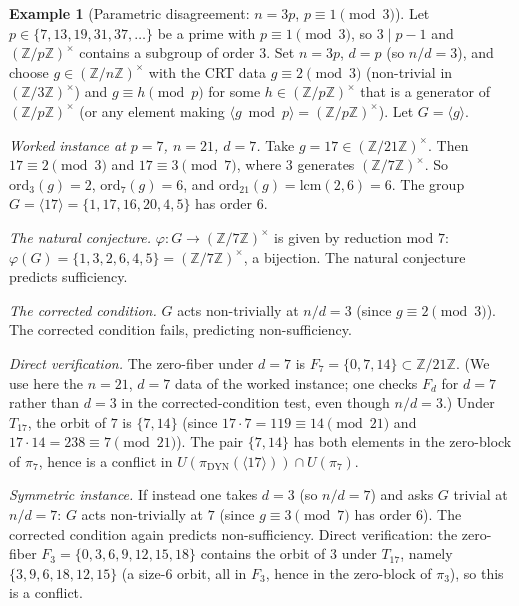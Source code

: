 \documentclass[11pt,reqno]{amsart}
\theoremstyle{plain}
\theoremstyle{definition}
\newtheorem{example}[theorem]{Example}
\newcommand{\Z}{\mathbb{Z}}
\newcommand{\Zns}{(\Z/n\Z)^{\times}}
\newcommand{\DYN}{\mathrm{DYN}}
\newcommand{\ord}{\mathrm{ord}}
\begin{document}
\begin{example}[Parametric disagreement: $n = 3p$, $p \equiv 1 \pmod 3$] \label{ex:parametric}
Let $p \in \{7, 13, 19, 31, 37, \ldots\}$ be a prime with $p \equiv 1 \pmod 3$, so $3 \mid p - 1$ and $(\Z/p\Z)^{\times}$ contains a subgroup of order $3$. Set $n = 3p$, $d = p$ (so $n/d = 3$), and choose $g \in \Zns$ with the CRT data $g \equiv 2 \pmod 3$ (non-trivial in $(\Z/3\Z)^{\times}$) and $g \equiv h \pmod p$ for some $h \in (\Z/p\Z)^{\times}$ that is a generator of $(\Z/p\Z)^{\times}$ (or any element making $\langle g \bmod p \rangle = (\Z/p\Z)^{\times}$). Let $G = \langle g \rangle$.

\emph{Worked instance at $p = 7$, $n = 21$, $d = 7$.} Take $g = 17 \in (\Z/21\Z)^{\times}$. Then $17 \equiv 2 \pmod 3$ and $17 \equiv 3 \pmod 7$, where $3$ generates $(\Z/7\Z)^{\times}$. So $\ord_3(g) = 2$, $\ord_7(g) = 6$, and $\ord_{21}(g) = \mathrm{lcm}(2, 6) = 6$. The group $G = \langle 17 \rangle = \{1, 17, 16, 20, 4, 5\}$ has order $6$.

\emph{The natural conjecture.} $\varphi \colon G \to (\Z/7\Z)^{\times}$ is given by reduction mod $7$: $\varphi(G) = \{1, 3, 2, 6, 4, 5\} = (\Z/7\Z)^{\times}$, a bijection. The natural conjecture predicts sufficiency.

\emph{The corrected condition.} $G$ acts non-trivially at $n/d = 3$ (since $g \equiv 2 \pmod 3$). The corrected condition fails, predicting non-sufficiency.

\emph{Direct verification.} The zero-fiber under $d = 7$ is $F_7 = \{0, 7, 14\} \subset \Z/21\Z$. (We use here the $n = 21$, $d = 7$ data of the worked instance; one checks $F_d$ for $d = 7$ rather than $d = 3$ in the corrected-condition test, even though $n/d = 3$.) Under $T_{17}$, the orbit of $7$ is $\{7, 14\}$ (since $17 \cdot 7 = 119 \equiv 14 \pmod{21}$ and $17 \cdot 14 = 238 \equiv 7 \pmod{21}$). The pair $\{7, 14\}$ has both elements in the zero-block of $\pi_7$, hence is a conflict in $U(\pi_{\DYN}(\langle 17 \rangle)) \cap U(\pi_7)$.

\emph{Symmetric instance.} If instead one takes $d = 3$ (so $n/d = 7$) and asks $G$ trivial at $n/d = 7$: $G$ acts non-trivially at $7$ (since $g \equiv 3 \pmod 7$ has order $6$). The corrected condition again predicts non-sufficiency. Direct verification: the zero-fiber $F_3 = \{0, 3, 6, 9, 12, 15, 18\}$ contains the orbit of $3$ under $T_{17}$, namely $\{3, 9, 6, 18, 12, 15\}$ (a size-$6$ orbit, all in $F_3$, hence in the zero-block of $\pi_3$), so this is a conflict.


\end{example}
\end{document}

